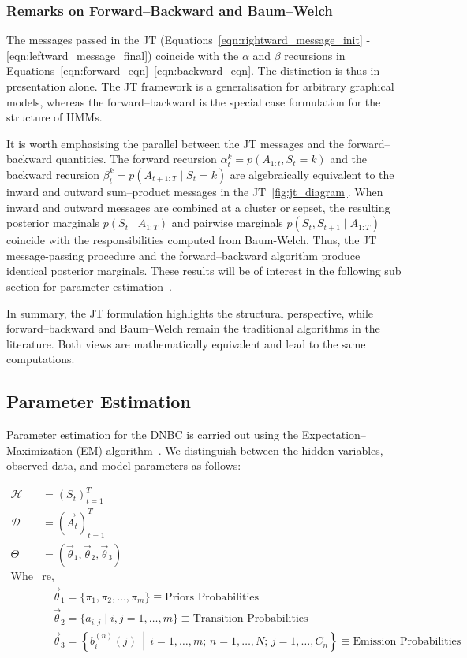 \subsubsection*{Remarks on Forward–Backward and Baum–Welch}
The messages passed in the JT (Equations~\ref{eqn:rightward_message_init} - \ref{eqn:leftward_message_final}) coincide with the $\alpha$ and $\beta$ recursions in Equations~\ref{eqn:forward_eqn}–\ref{eqn:backward_eqn}. The distinction is thus in presentation alone. The JT framework is a generalisation for arbitrary graphical models, whereas the forward–backward is the special case formulation for the structure of HMMs\cite{hmm_slides}.

It is worth emphasising the parallel between the JT messages and the forward–backward quantities. The forward recursion $\alpha_t^k=p(A_{1:t},S_t=k)$ and the backward recursion $\mathit{\beta_t^k=p(A_{t+1:T}\mid S_t=k)}$ are algebraically equivalent to the inward and outward sum–product messages in the JT~\ref{fig:jt_diagram}. When inward and outward messages are combined at a cluster or sepset, the resulting posterior marginals $p(S_t \mid A_{1:T})$ and pairwise marginals $p(S_t,S_{t+1}\mid A_{1:T})$ coincide with the responsibilities computed from Baum-Welch. Thus, the JT message-passing procedure and the forward–backward algorithm produce identical posterior marginals. These results will be of interest in the following sub section for parameter estimation~\cite{aviles,dnbc_drought_first,hmm_slides,wiki:baum_welch}.

In summary, the JT formulation highlights the structural perspective, while forward–backward and Baum–Welch remain the traditional algorithms in the literature. Both views are mathematically equivalent and lead to the same computations.

\subsection{Parameter Estimation}
Parameter estimation for the DNBC is carried out using the Expectation–Maximization (EM) algorithm~\cite{moon_tk}.  
We distinguish between the hidden variables, observed data, and model parameters as follows:

\begin{align*}
    \mathcal{H} &= (S_t)_{t=1}^T  \\
    \mathcal{D} &= (\vec{A}_t)_{t=1}^T  \\
    \Theta &= (\vec{\theta}_1, \vec{\theta}_2, \vec{\theta}_3)  \\
    \text{Whe}& \text{re,} \\
     & \quad \vec{\theta}_1 = \{\pi_1, \pi_2, \dots, \pi_m\} \equiv \text{Priors Probabilities}  \\
     & \quad \vec{\theta}_2 = \{a_{i,j} \mid i,j = 1, \dots, m\} \equiv \text{Transition Probabilities}  \\
     & \quad \vec{\theta}_3 = \left\{ b_i^{(n)}(j) \,\middle|\, i = 1,\dots,m; \, n = 1,\dots,N; \, j = 1,\dots,C_n \right\} \equiv \text{Emission Probabilities} 
\end{align*}

